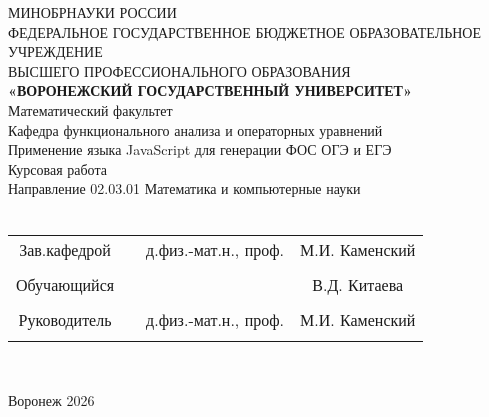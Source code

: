 
\begin{center}
	\hfill \break
	\large{МИНОБРНАУКИ РОССИИ}\\
	\footnotesize{ФЕДЕРАЛЬНОЕ ГОСУДАРСТВЕННОЕ БЮДЖЕТНОЕ ОБРАЗОВАТЕЛЬНОЕ УЧРЕЖДЕНИЕ}\\
	\footnotesize{ВЫСШЕГО ПРОФЕССИОНАЛЬНОГО ОБРАЗОВАНИЯ}\\
	\small{\textbf{«ВОРОНЕЖСКИЙ ГОСУДАРСТВЕННЫЙ УНИВЕРСИТЕТ»}}\\
	\hfill \break
	\normalsize{Математический факультет}\\
	\hfill \break
	\normalsize{Кафедра функционального анализа и операторных уравнений}\\
	\hfill\break
	\hfill \break
	\hfill \break
	\hfill \break
	\large{Применение языка JavaScript для генерации ФОС ОГЭ и ЕГЭ}\\
	\hfill \break
	\hfill \break
	\hfill \break
	\hfill \break
	\hfill \break
	\normalsize{Курсовая работа\\
		\hfill \break
		Направление 02.03.01 Математика и компьютерные науки\\

		\hfill \break
	}\\
	\hfill \break
	\hfill \break
\end{center}
\hfill \break

\normalsize{
	\begin{tabular}{cccc}
		Зав.кафедрой & \underline{\hspace{3cm}} & д.физ.-мат.н.,  проф. & М.И. Каменский    \\\\
		Обучающийся  & \underline{\hspace{3cm}} &                       & В.Д. Китаева \\\\
		Руководитель & \underline{\hspace{3cm}} & д.физ.-мат.н.,  проф. & М.И. Каменский    \\\\
	\end{tabular}
}\\
\hfill \break
\hfill \break
\begin{center} Воронеж 2026 \end{center}
\thispagestyle{empty} %

